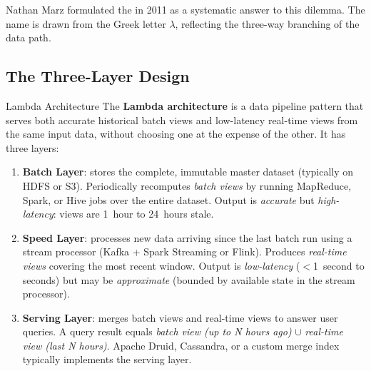 Nathan Marz formulated the  in 2011 as a systematic
answer to this dilemma. The name is drawn from the Greek letter $\lambda$,
reflecting the three-way branching of the data path.

\subsection{The Three-Layer Design}
\label{subsec:lambda-layers}

\begin{defbox}{Lambda Architecture}
The \textbf{Lambda architecture} is a data pipeline pattern that serves
both accurate historical batch views and low-latency real-time views from
the same input data, without choosing one at the expense of the other.
It has three layers:
\begin{enumerate}
  \item \textbf{Batch Layer}: stores the complete, immutable master dataset
        (typically on HDFS or S3). Periodically recomputes \emph{batch views}
        by running MapReduce, Spark, or Hive jobs over the entire dataset.
        Output is \emph{accurate} but \emph{high-latency}: views are
        1~hour to 24~hours stale.
  \item \textbf{Speed Layer}: processes new data arriving since the last
        batch run using a stream processor (Kafka + Spark Streaming or
        Flink). Produces \emph{real-time views} covering the most recent
        window. Output is \emph{low-latency} ($<$1~second to seconds) but
        may be \emph{approximate} (bounded by available state in the
        stream processor).
  \item \textbf{Serving Layer}: merges batch views and real-time views
        to answer user queries. A query result equals
        \emph{batch view (up to N hours ago)} $\cup$ \emph{real-time view
        (last N hours)}. Apache Druid, Cassandra, or a custom merge index
        typically implements the serving layer.
\end{enumerate}
\end{defbox}


